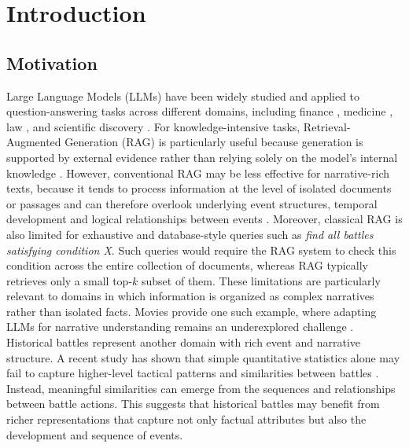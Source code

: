 \chapter{Introduction}
\label{chap:introduction}

\section{Motivation}
\label{sec:motivation}
Large Language Models (LLMs) have been widely studied and applied to question-answering tasks across different domains, including finance \citep{sarmah2024hybridrag}, medicine \citep{wang2024llmhealthcare}, law \citep{lai2024llmlaw}, and scientific discovery \citep{zhang2024scientificllm}. For knowledge-intensive tasks, Retrieval-Augmented Generation (RAG) is particularly useful because generation is supported by external evidence rather than relying solely on the model's internal knowledge \citep{lewis2020rag}. However, conventional RAG may be less effective for narrative-rich texts, because it tends to process information at the level of isolated documents or passages and can therefore overlook underlying event structures, temporal development and logical relationships between events \citep{yang2025eventrag}. Moreover, classical RAG is also limited for exhaustive and database-style queries such as \textit{find all battles satisfying condition X}. Such queries would require the RAG system to check this condition across the entire collection of documents, whereas RAG typically retrieves only a small top-$k$ subset of them. These limitations are particularly relevant to domains in which information is organized as complex narratives rather than isolated facts. Movies provide one such example, where adapting LLMs for narrative understanding remains an underexplored challenge \citep{shen2025narrative}. Historical battles represent another domain with rich event and narrative structure. A recent study has shown that simple quantitative statistics alone may fail to capture higher-level tactical patterns and similarities between battles \citep{coulson2023actionclusters}. Instead, meaningful similarities can emerge from the sequences and relationships between battle actions. This suggests that historical battles may benefit from richer representations that capture not only factual attributes but also the development and sequence of events.


